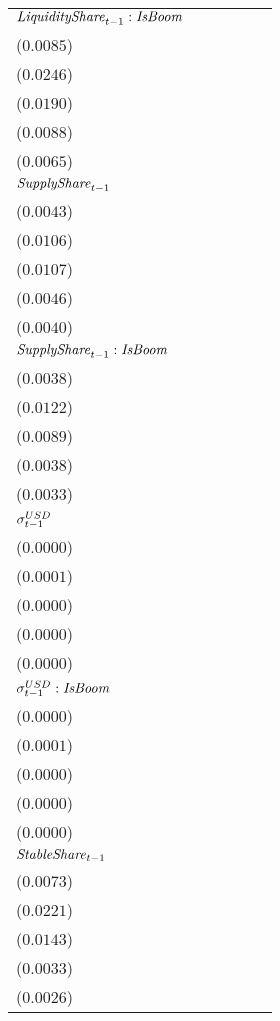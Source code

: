 \begin{tabular}{llllll}
${\it LiquidityShare}_{t-1}:{\it IsBoom}$ &     \makecell{$-0.0012^{}$ \\ ($0.0085$)} &      \makecell{$0.0267^{}$ \\ ($0.0246$)} &     \makecell{$-0.0020^{}$ \\ ($0.0190$)} &      \makecell{$0.0089^{}$ \\ ($0.0088$)} &      \makecell{$0.0068^{}$ \\ ($0.0065$)} \\
${\it SupplyShare}_{t-1}$                 &   \makecell{$0.0195^{***}$ \\ ($0.0043$)} &   \makecell{$0.0399^{***}$ \\ ($0.0106$)} &   \makecell{$0.0428^{***}$ \\ ($0.0107$)} &      \makecell{$0.0073^{}$ \\ ($0.0046$)} &      \makecell{$0.0036^{}$ \\ ($0.0040$)} \\
${\it SupplyShare}_{t-1}:{\it IsBoom}$    &    \makecell{$-0.0069^{*}$ \\ ($0.0038$)} &     \makecell{$-0.0017^{}$ \\ ($0.0122$)} &   \makecell{$-0.0198^{**}$ \\ ($0.0089$)} &     \makecell{$-0.0006^{}$ \\ ($0.0038$)} &     \makecell{$-0.0001^{}$ \\ ($0.0033$)} \\
${\it \sigma}^{USD}_{t-1}$                &    \makecell{$-0.0000^{*}$ \\ ($0.0000$)} &   \makecell{$-0.0001^{**}$ \\ ($0.0001$)} &   \makecell{$0.0000^{***}$ \\ ($0.0000$)} &     \makecell{$0.0000^{*}$ \\ ($0.0000$)} &      \makecell{$0.0000^{}$ \\ ($0.0000$)} \\
${\it \sigma}^{USD}_{t-1}:{\it IsBoom}$   &   \makecell{$0.0000^{***}$ \\ ($0.0000$)} &   \makecell{$0.0003^{***}$ \\ ($0.0001$)} &  \makecell{$-0.0000^{***}$ \\ ($0.0000$)} &     \makecell{$-0.0000^{}$ \\ ($0.0000$)} &     \makecell{$-0.0000^{}$ \\ ($0.0000$)} \\
${\it StableShare}_{t-1}$                 &   \makecell{$0.0464^{***}$ \\ ($0.0073$)} &   \makecell{$0.1281^{***}$ \\ ($0.0221$)} &   \makecell{$0.0951^{***}$ \\ ($0.0143$)} &     \makecell{$-0.0011^{}$ \\ ($0.0033$)} &   \makecell{$-0.0057^{**}$ \\ ($0.0026$)} \\

\end{tabular}
